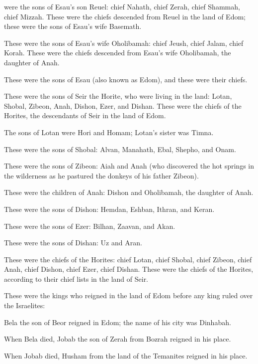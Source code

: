 {were the sons
of Esau’s
son
Reuel: chief
Nahath,
chief
Zerah,
chief
Shammah,
chief
Mizzah.
These
were the chiefs
descended from Reuel
in the land
of Edom;
these
were the sons
of Esau’s
wife
Basemath.
\par }{\PP {}These
were the sons
of Esau’s
wife
Oholibamah: chief
Jeush,
chief
Jalam,
chief
Korah.
These
were the chiefs
descended from Esau’s
wife
Oholibamah,
the daughter
of Anah.
\par }{\PP {}These
were the sons
of Esau
(also known as Edom), and these
were their chiefs.
\par }{\PP {}These
were the sons
of Seir
the Horite,
who were living
in the land: Lotan,
Shobal,
Zibeon,
Anah,
Dishon,
Ezer,
and Dishan.
These
were the chiefs
of the Horites,
the descendants
of Seir
in the land
of Edom.
\par }{\PP {}The sons
of Lotan
were Hori
and Homam;
Lotan’s
sister
was Timna.
\par }{\PP {}These
were the sons
of Shobal: Alvan,
Manahath,
Ebal,
Shepho,
and Onam.
\par }{\PP {}These
were the sons
of Zibeon: Aiah
and Anah
(who discovered
the hot springs
in the wilderness
as he pastured
the donkeys
of his father
Zibeon).
\par }{\PP {}These
were the children
of Anah: Dishon
and Oholibamah,
the daughter
of Anah.
\par }{\PP {}These
were the sons
of Dishon: Hemdan,
Eshban,
Ithran,
and Keran.
\par }{\PP {}These
were the sons
of Ezer: Bilhan,
Zaavan,
and Akan.
\par }{\PP {}These
were the sons
of Dishan: Uz
and Aran.
\par }{\PP {}These
were the chiefs
of the Horites: chief
Lotan,
chief
Shobal,
chief
Zibeon,
chief
Anah,
chief
Dishon,
chief
Ezer,
chief
Dishan.
These
were the chiefs
of the Horites,
according to their chief
lists in the land
of Seir.
\par }{\PP {}These
were the kings
who
reigned
in the land
of Edom
before
any king
ruled
over the Israelites:
\par }{\PP {}Bela
the son
of Beor
reigned
in Edom;
the name
of his city
was Dinhabah.
\par }{\PP {}When Bela
died,
Jobab
the son
of Zerah
from Bozrah
reigned
in his place.
\par }{\PP {}When Jobab
died,
Husham
from the land
of the Temanites
reigned
in his place.
}

